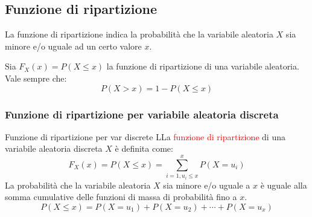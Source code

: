 \documentclass{article}  %
\theoremstyle{definition}
\begin{document}
\subsection{Funzione di ripartizione}
La funzione di ripartizione indica la probabilità che la variabile aleatoria $X$ sia minore e/o uguale ad un certo valore $x$.
\begin{osservazioni}[Osservazione:]
	Sia $F_X(x)=P(X \leq x)$ la funzione di ripartizione di una variabile aleatoria. Vale sempre che:
	\[
		P(X > x) = 1 - P(X \leq x)
	\]
\end{osservazioni}
\subsubsection{Funzione di ripartizione per variabile aleatoria discreta}
\begin{theorem}{Funzione di ripartizione per var discrete}
	LLa \textcolor{red}{funzione di ripartizione} di una variabile aleatoria discreta $X$ è definita come:
	\[
		F_{X}(x)=P(X \leq x)=\sum_{i=1, u_i \leq x}^{x} P(X=u_i)
	\]
	La probabilità che la variabile aleatoria $X$ sia minore e/o uguale a $x$ è uguale alla somma cumulative delle funzioni di massa di probabilità fino a $x$. \\
	\[
		P(X \leq x) = P(X=u_1)+P(X=u_2)+\cdots+P(X=u_{x})
	\]
\end{theorem}
\end{document}
